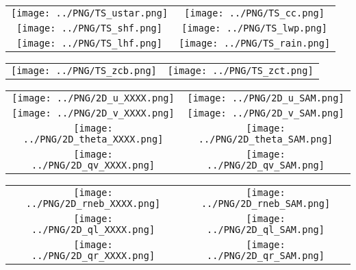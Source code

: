 \documentclass{article}
\begin{document}

\begin{table}
  \begin{tabular}{cc}
    \texttt{[image: ../PNG/TS\_ustar.png]} & \texttt{[image: ../PNG/TS\_cc.png]}   \\ 
    \texttt{[image: ../PNG/TS\_shf.png]}   & \texttt{[image: ../PNG/TS\_lwp.png]}  \\
    \texttt{[image: ../PNG/TS\_lhf.png]}   & \texttt{[image: ../PNG/TS\_rain.png]}
  \end{tabular}
\end{table}

\newpage

\begin{table}
  \begin{tabular}{cc}
    \texttt{[image: ../PNG/TS\_zcb.png]} &  \texttt{[image: ../PNG/TS\_zct.png]}
  \end{tabular}
\end{table}

\newpage

\begin{table}
  \begin{tabular}{cc}
     \texttt{[image: ../PNG/2D\_u\_XXXX.png]}     & \texttt{[image: ../PNG/2D\_u\_SAM.png]}     \\
     \texttt{[image: ../PNG/2D\_v\_XXXX.png]}     & \texttt{[image: ../PNG/2D\_v\_SAM.png]}     \\
     \texttt{[image: ../PNG/2D\_theta\_XXXX.png]} & \texttt{[image: ../PNG/2D\_theta\_SAM.png]} \\
     \texttt{[image: ../PNG/2D\_qv\_XXXX.png]}    & \texttt{[image: ../PNG/2D\_qv\_SAM.png]}
  \end{tabular}
\end{table}

\newpage

\begin{table}
  \begin{tabular}{cc}
     \texttt{[image: ../PNG/2D\_rneb\_XXXX.png]} & \texttt{[image: ../PNG/2D\_rneb\_SAM.png]} \\
     \texttt{[image: ../PNG/2D\_ql\_XXXX.png]}   & \texttt{[image: ../PNG/2D\_ql\_SAM.png]}   \\
     \texttt{[image: ../PNG/2D\_qr\_XXXX.png]}   & \texttt{[image: ../PNG/2D\_qr\_SAM.png]}
  \end{tabular}
\end{table}
\end{document}
